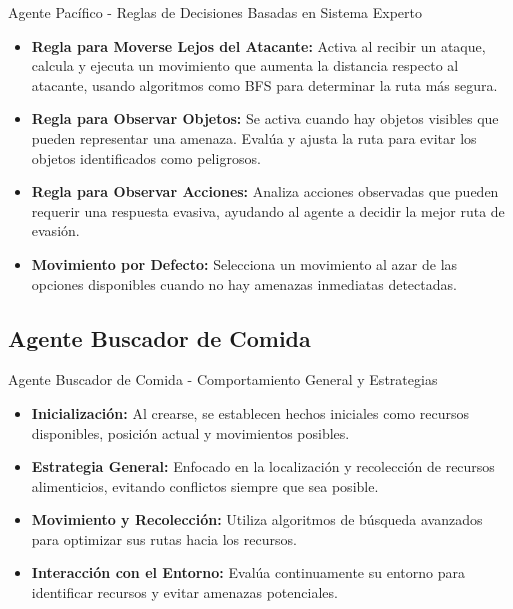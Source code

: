 \documentclass{beamer}
\begin{document}
\begin{frame}{Agente Pacífico - Reglas de Decisiones Basadas en Sistema Experto}
  \begin{itemize}
    \item \textbf{Regla para Moverse Lejos del Atacante:} Activa al recibir un ataque, calcula y ejecuta un movimiento que aumenta la distancia respecto al atacante, usando algoritmos como BFS para determinar la ruta más segura.
    \item \textbf{Regla para Observar Objetos:} Se activa cuando hay objetos visibles que pueden representar una amenaza. Evalúa y ajusta la ruta para evitar los objetos identificados como peligrosos.
    \item \textbf{Regla para Observar Acciones:} Analiza acciones observadas que pueden requerir una respuesta evasiva, ayudando al agente a decidir la mejor ruta de evasión.
    \item \textbf{Movimiento por Defecto:} Selecciona un movimiento al azar de las opciones disponibles cuando no hay amenazas inmediatas detectadas.
  \end{itemize}
\end{frame}


\subsection{Agente Buscador de Comida}
\begin{frame}{Agente Buscador de Comida - Comportamiento General y Estrategias}
  \begin{itemize}
    \item \textbf{Inicialización:} Al crearse, se establecen hechos iniciales como recursos disponibles, posición actual y movimientos posibles.
    \item \textbf{Estrategia General:} Enfocado en la localización y recolección de recursos alimenticios, evitando conflictos siempre que sea posible.
    \item \textbf{Movimiento y Recolección:} Utiliza algoritmos de búsqueda avanzados para optimizar sus rutas hacia los recursos.
    \item \textbf{Interacción con el Entorno:} Evalúa continuamente su entorno para identificar recursos y evitar amenazas potenciales.
  \end{itemize}
\end{frame}
\end{document}
